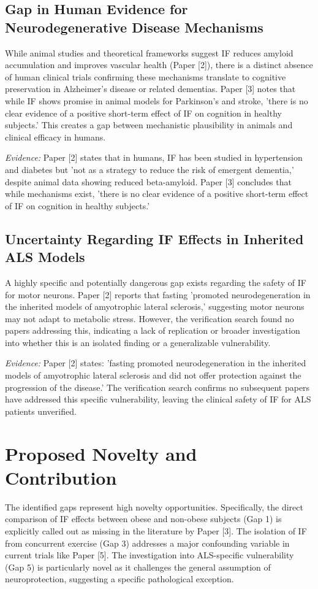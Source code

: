 \documentclass[11pt]{article}
\begin{document}
\subsection{Gap in Human Evidence for Neurodegenerative Disease Mechanisms}
While animal studies and theoretical frameworks suggest IF reduces amyloid accumulation and improves vascular health (Paper [2]), there is a distinct absence of human clinical trials confirming these mechanisms translate to cognitive preservation in Alzheimer's disease or related dementias. Paper [3] notes that while IF shows promise in animal models for Parkinson's and stroke, 'there is no clear evidence of a positive short-term effect of IF on cognition in healthy subjects.' This creates a gap between mechanistic plausibility in animals and clinical efficacy in humans.

\textit{Evidence:} Paper [2] states that in humans, IF has been studied in hypertension and diabetes but 'not as a strategy to reduce the risk of emergent dementia,' despite animal data showing reduced beta-amyloid. Paper [3] concludes that while mechanisms exist, 'there is no clear evidence of a positive short-term effect of IF on cognition in healthy subjects.'

\subsection{Uncertainty Regarding IF Effects in Inherited ALS Models}
A highly specific and potentially dangerous gap exists regarding the safety of IF for motor neurons. Paper [2] reports that fasting 'promoted neurodegeneration in the inherited models of amyotrophic lateral sclerosis,' suggesting motor neurons may not adapt to metabolic stress. However, the verification search found no papers addressing this, indicating a lack of replication or broader investigation into whether this is an isolated finding or a generalizable vulnerability.

\textit{Evidence:} Paper [2] states: 'fasting promoted neurodegeneration in the inherited models of amyotrophic lateral sclerosis and did not offer protection against the progression of the disease.' The verification search confirms no subsequent papers have addressed this specific vulnerability, leaving the clinical safety of IF for ALS patients unverified.

\section{Proposed Novelty and Contribution}
The identified gaps represent high novelty opportunities. Specifically, the direct comparison of IF effects between obese and non-obese subjects (Gap 1) is explicitly called out as missing in the literature by Paper [3]. The isolation of IF from concurrent exercise (Gap 3) addresses a major confounding variable in current trials like Paper [5]. The investigation into ALS-specific vulnerability (Gap 5) is particularly novel as it challenges the general assumption of neuroprotection, suggesting a specific pathological exception.
\end{document}
